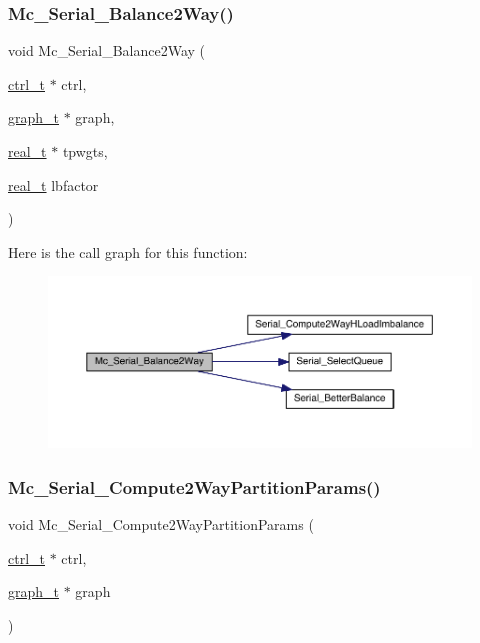 \subsubsection{\texorpdfstring{Mc\+\_\+\+Serial\+\_\+\+Balance2\+Way()}{Mc\_Serial\_Balance2Way()}}
{\footnotesize\ttfamily void Mc\+\_\+\+Serial\+\_\+\+Balance2\+Way (\begin{DoxyParamCaption}\item[{\hyperlink{a00742}{ctrl\+\_\+t} $\ast$}]{ctrl,  }\item[{\hyperlink{a00734}{graph\+\_\+t} $\ast$}]{graph,  }\item[{\hyperlink{a00876_a1924a4f6907cc3833213aba1f07fcbe9}{real\+\_\+t} $\ast$}]{tpwgts,  }\item[{\hyperlink{a00876_a1924a4f6907cc3833213aba1f07fcbe9}{real\+\_\+t}}]{lbfactor }\end{DoxyParamCaption})}

Here is the call graph for this function\+:\nopagebreak
\begin{figure}[H]
\begin{center}
\leavevmode
\includegraphics[width=350pt]{a00407_a89fa5b7aa9a8bab154de5a47d47d9d60_cgraph}
\end{center}
\end{figure}
\mbox{\label{a00407_acd91d34fdc0988e13fe82f76f97f6d03}} 
\subsubsection{\texorpdfstring{Mc\+\_\+\+Serial\+\_\+\+Compute2\+Way\+Partition\+Params()}{Mc\_Serial\_Compute2WayPartitionParams()}}
{\footnotesize\ttfamily void Mc\+\_\+\+Serial\+\_\+\+Compute2\+Way\+Partition\+Params (\begin{DoxyParamCaption}\item[{\hyperlink{a00742}{ctrl\+\_\+t} $\ast$}]{ctrl,  }\item[{\hyperlink{a00734}{graph\+\_\+t} $\ast$}]{graph }\end{DoxyParamCaption})}

